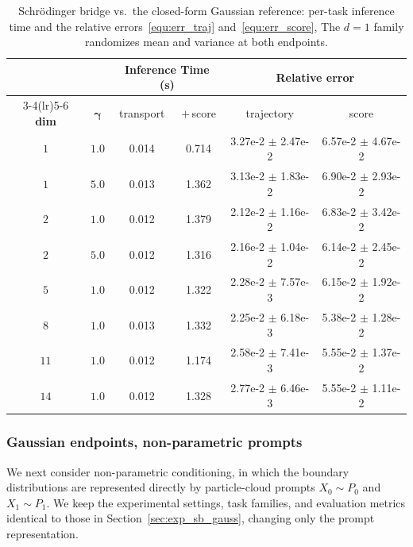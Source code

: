 \documentclass[preprint]{elsarticle}
\newcommand{\g}{\gamma}
\begin{document}
\begin{table}[!htpb]
    \centering
    \caption{Schr\"odinger bridge vs.\ the closed-form Gaussian reference:
    per-task inference time and the relative errors~\eqref{equ:err_traj}
    and~\eqref{equ:err_score}, The $d=1$ family randomizes mean and
    variance at both endpoints. 
    }
    \label{tab:sb_error_comparison}
    \begin{tabular}{cccccc}
        \toprule
         &  & \multicolumn{2}{c}{\textbf{Inference Time (s)}}
            & \multicolumn{2}{c}{\textbf{Relative error}} \\
        \cmidrule(lr){3-4}\cmidrule(lr){5-6}
        \textbf{dim} & $\boldsymbol{\g}$ & transport & $+$\,score
            & trajectory & score \\
        \midrule
        $1$  & $1.0$  & 0.014 & 0.714 & 3.27e-2 $\pm$ 2.47e-2 & 6.57e-2 $\pm$ 4.67e-2 \\
        $1$  & $5.0$  & 0.013 & 1.362 & 3.13e-2 $\pm$ 1.83e-2 & 6.90e-2 $\pm$ 2.93e-2 \\
        \midrule
        $2$  & $1.0$  & 0.012 & 1.379 & 2.12e-2 $\pm$ 1.16e-2 & 6.83e-2 $\pm$ 3.42e-2 \\
        $2$  & $5.0$  & 0.012 & 1.316 & 2.16e-2 $\pm$ 1.04e-2 & 6.14e-2 $\pm$ 2.45e-2 \\
        \midrule
        $5$  & $1.0$  & 0.012 & 1.322 & 2.28e-2 $\pm$ 7.57e-3 & 6.15e-2 $\pm$ 1.92e-2 \\
        $8$  & $1.0$  & 0.013 & 1.332 & 2.25e-2 $\pm$ 6.18e-3 & 5.38e-2 $\pm$ 1.28e-2 \\
        $11$ & $1.0$  & 0.012 & 1.174 & 2.58e-2 $\pm$ 7.41e-3 & 5.55e-2 $\pm$ 1.37e-2 \\
        $14$ & $1.0$  & 0.012 & 1.328 & 2.77e-2 $\pm$ 6.46e-3 & 5.55e-2 $\pm$ 1.11e-2 \\
        \bottomrule
    \end{tabular}
\end{table}

\subsubsection{Gaussian endpoints, non-parametric prompts}
\label{sec:exp_nonparam_sb}
We next consider non-parametric conditioning, in which the boundary distributions are represented directly by particle-cloud prompts $X_0\sim P_0$ and $X_1\sim P_1$. We keep the experimental settings, task families, and evaluation metrics identical to those in Section~\ref{sec:exp_sb_gauss}, changing only the prompt representation.
\end{document}
